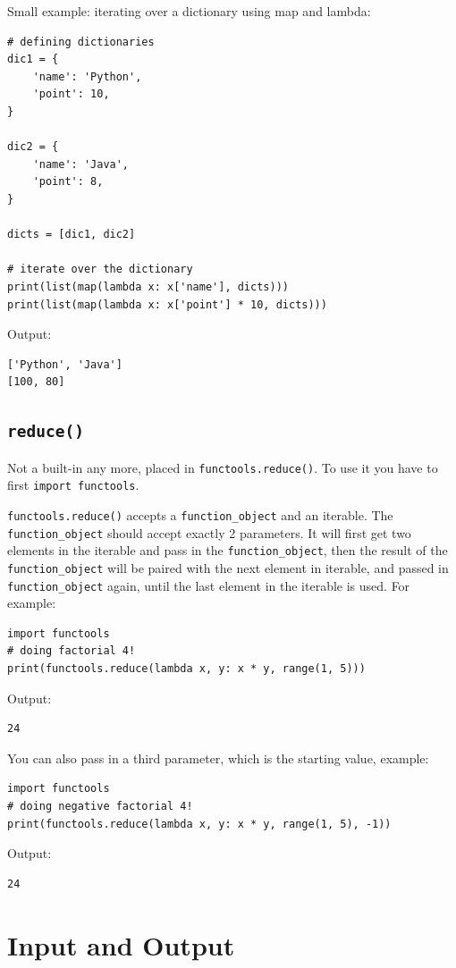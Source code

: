 \documentclass[12pt]{book}
\begin{document}
Small example: iterating over a dictionary using map and lambda:
\begin{verbatim}
# defining dictionaries
dic1 = {
    'name': 'Python',
    'point': 10,
}

dic2 = {
    'name': 'Java',
    'point': 8,
}

dicts = [dic1, dic2]

# iterate over the dictionary
print(list(map(lambda x: x['name'], dicts)))
print(list(map(lambda x: x['point'] * 10, dicts)))
\end{verbatim}
Output:
\begin{verbatim}
['Python', 'Java']
[100, 80]
\end{verbatim}
\section{\texttt{reduce()}}
\label{sec:org8afe75f}
Not a built-in any more, placed in \texttt{functools.reduce()}. To use it you have to first \texttt{import functools}.

\texttt{functools.reduce()} accepts a \texttt{function\_object} and an iterable. The \texttt{function\_object} should accept exactly 2 parameters. It will first get two elements in the iterable and pass in the \texttt{function\_object}, then the result of the \texttt{function\_object} will be paired with the next element in iterable, and passed in \texttt{function\_object} again, until the last element in the iterable is used. For example:
\begin{verbatim}
import functools
# doing factorial 4!
print(functools.reduce(lambda x, y: x * y, range(1, 5)))
\end{verbatim}
Output:
\begin{verbatim}
24
\end{verbatim}

You can also pass in a third parameter, which is the starting value, example:
\begin{verbatim}
import functools
# doing negative factorial 4!
print(functools.reduce(lambda x, y: x * y, range(1, 5), -1))
\end{verbatim}
Output:
\begin{verbatim}
24
\end{verbatim}

\chapter{Input and Output}
\label{sec:orge89ece9}
\end{document}
